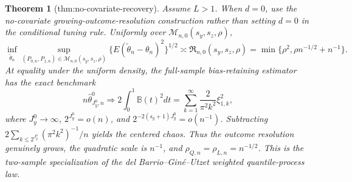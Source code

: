 \documentclass{article}
\newtheorem{theorem}{Theorem}
\begin{document}
\begin{theorem}[thm:no-covariate-recovery]\label{thm:no-covariate-recovery}
Assume \(L>1\). When \(d=0\), use the no-covariate growing-outcome-resolution construction rather than setting \(d=0\) in the conditional tuning rule. Uniformly over \(\mathcal M_{n,0}(s_y,s_z,\rho)\),
\[
\inf_{\widetilde\theta_n}\sup_{(P_{0,n},P_{1,n})\in\mathcal M_{n,0}(s_y,s_z,\rho)}\{E(\widetilde\theta_n-\theta_n)^2\}^{1/2}\asymp\mathfrak R_{n,0}(s_y,s_z,\rho)=\min\{\rho^2,\rho n^{-1/2}+n^{-1}\}.
\]
At equality under the uniform density, the full-sample bias-retaining estimator has the exact benchmark
\[
n\widehat\theta^0_{J_y^0,n}\Rightarrow2\int_0^1\mathbb B(t)^2dt=\sum_{k=1}^{\infty}\frac{2}{\pi^2k^2}\xi_{1,k}^2,
\]
where \(J_y^0\to\infty\), \(2^{J_y^0}=o(n)\), and \(2^{-2(s_y+1)J_y^0}=o(n^{-1})\). Subtracting \(2\sum_{k\le2^{J_y^0}}(\pi^2k^2)^{-1}/n\) yields the centered chaos. Thus the outcome resolution genuinely grows, the quadratic scale is \(n^{-1}\), and \(\rho_{Q,n}=\rho_{L,n}=n^{-1/2}\). This is the two-sample specialization of the del Barrio--Gin\'e--Utzet weighted quantile-process law.
\end{theorem}
\end{document}
